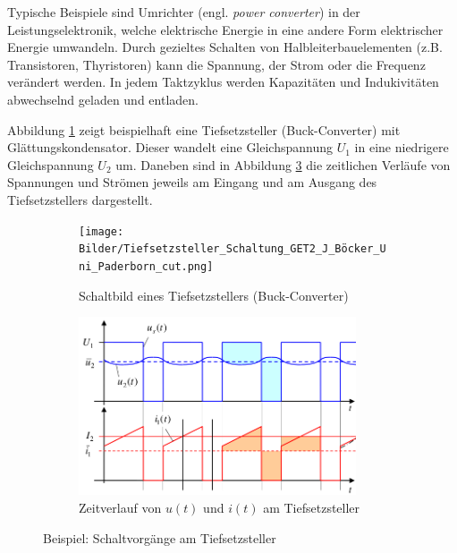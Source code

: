 \begin{frame}
{	Typische Beispiele sind Umrichter (engl. \textit{power converter}) in der Leistungselektronik,
	welche elektrische Energie in eine andere Form elektrischer Energie umwandeln. 
	Durch gezieltes Schalten von Halbleiterbauelementen (z.B. Transistoren, Thyristoren) 
	kann die Spannung, der Strom oder die Frequenz verändert werden. 
	In jedem Taktzyklus werden Kapazitäten und Indukivitäten abwechselnd geladen und entladen. 
	
	Abbildung \ref{fig:circ:pulldown} zeigt beispielhaft eine Tiefsetzsteller (Buck-Converter) mit Glättungskondensator.
	Dieser wandelt eine Gleichspannung $U_1$ in eine niedrigere Gleichspannung $U_2$ um. 
	Daneben sind in Abbildung \ref{fig:plot:pulldown} die zeitlichen Verläufe von Spannungen und Strömen
	jeweils am Eingang und am Ausgang des Tiefsetzstellers dargestellt.

	\begin{figure}[H]\centering
		\begin{subfigure}{0.5\textwidth}\centering
			\texttt{[image: Bilder/Tiefsetzsteller\_Schaltung\_GET2\_J\_Böcker\_Uni\_Paderborn\_cut.png]}
			\caption{Schaltbild eines Tiefsetzstellers (Buck-Converter)}
			\label{fig:circ:pulldown}
		\end{subfigure}%
		\begin{subfigure}{0.5\textwidth}\centering
			\includegraphics[width=0.9\textwidth]{Bilder/Tiefsetzsteller_Zeitverläufe_GET2_J_Böcker_Uni_Paderborn_cut_edit.png}
			\caption{Zeitverlauf von $u(t)$ und $i(t)$ am Tiefsetzsteller}
			\label{fig:plot:pulldown}
		\end{subfigure}
		\caption{Beispiel: Schaltvorgänge am Tiefsetzsteller\protect\footnotemark}
	\end{figure}

}
\end{frame}
